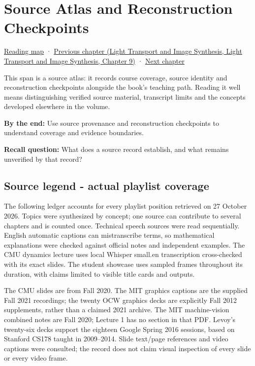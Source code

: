 \hypertarget{04-visual-computing-ii-ch036}{}
\chapter{Source Atlas and Reconstruction Checkpoints}\label{stagechapter:04-visual-computing-ii-ch036}\label{04-visual-computing-ii-ch036-source-atlas-and-reconstruction-checkpoints}

\hyperref[volume-reading-map]{Reading map} · \href{../04-Light-Transport-and-Image-Synthesis/main.pdf\#nameddest=04-visual-computing-ii-ch035-a-complete-renderer-as-an-executable-forward-model}{Previous chapter (Light Transport and Image Synthesis, Light Transport and Image Synthesis, Chapter 9)} · \hyperref[04-visual-computing-ii-ch037-gaussian-splatting-and-editable-captured-worlds]{Next chapter}

This span is a source atlas: it records course coverage, source identity and reconstruction checkpoints alongside the book's teaching path. Reading it well means distinguishing verified source material, transcript limits and the concepts developed elsewhere in the volume.

\textbf{By the end:} Use source provenance and reconstruction checkpoints to understand coverage and evidence boundaries.

\textbf{Recall question:} What does a source record establish, and what remains unverified by that record?

\section{Source legend - actual playlist coverage}\label{04-visual-computing-ii-ch036-source-legend---actual-playlist-coverage}

The following ledger accounts for every playlist position retrieved on 27 October 2026. Topics were synthesized by concept; one source can contribute to several chapters and is counted once. Technical speech sources were read sequentially. English automatic captions can mistranscribe terms, so mathematical explanations were checked against official notes and independent examples. The CMU dynamics lecture uses local Whisper small.en transcription cross-checked with its exact slides. The student showcase uses sampled frames throughout its duration, with claims limited to visible title cards and outputs.

The CMU slides are from Fall 2020. The MIT graphics captions are the supplied Fall 2021 recordings; the twenty OCW graphics decks are explicitly Fall 2012 supplements, rather than a claimed 2021 archive. The MIT machine-vision combined notes are Fall 2020; Lecture 1 has no section in that PDF. Levoy's twenty-six decks support the eighteen Google Spring 2016 sessions, based on Stanford CS178 taught in 2009--2014. Slide text/page references and video captions were consulted; the record does not claim visual inspection of every slide or every video frame.

